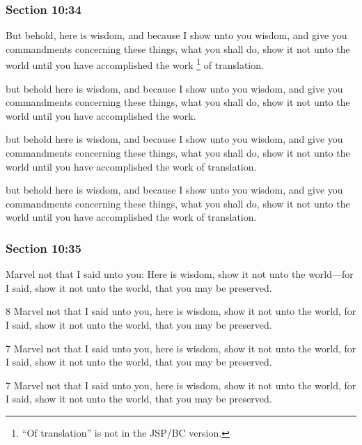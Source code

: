 	\subsubsection{Section 10:34} %
		\label{DC10-34}

		But behold, here is wisdom, and because I show unto you wisdom, and give you commandments concerning these things, what you shall do, show it not unto the world until you have accomplished the work
		\footnote{%
			``Of translation'' is not in the JSP/BC version.
			}
		of translation.

		\begin{framed}
		\scriptsize
			\begin{compactdesc}
				\item[JSP] but behold here is wisdom, and because I show unto you wisdom, and give you commandments concerning these things, what you shall do, show it not unto the world until you have accomplished the work.
				\item[RB1] [\textit{missing}] 
				\item[DC 1835] but behold here is wisdom, and because I show unto you wisdom, and give you commandments concerning these things, what you shall do, show it not unto the world until you have accomplished the work of translation.
				\item[DC 1844] but behold here is wisdom, and because I show unto you wisdom, and give you commandments concerning these things, what you shall do, show it not unto the world until you have accomplished the work of translation.
			\end{compactdesc}
		\end{framed}

	\subsubsection{Section 10:35} %
		\label{DC10-35}

		Marvel not that I said unto you: Here is wisdom, show it not unto the world---for I said, show it not unto the world, that you may be preserved.

		\begin{framed}
		\scriptsize
			\begin{compactdesc}
				\item[JSP] 8 Marvel not that I said unto you, here is wisdom, show it not unto the world, for I said, show it not unto the world, that you may be preserved.
				\item[RB1] [\textit{missing}] 
				\item[DC 1835] 7 Marvel not that I said unto you, here is wisdom, show it not unto the world, for I said, show it not unto the world, that you may be preserved.
				\item[DC 1844] 7 Marvel not that I said unto you, here is wisdom, show it not unto the world, for I said, show it not unto the world, that you may be preserved.
			\end{compactdesc}
		\end{framed}

